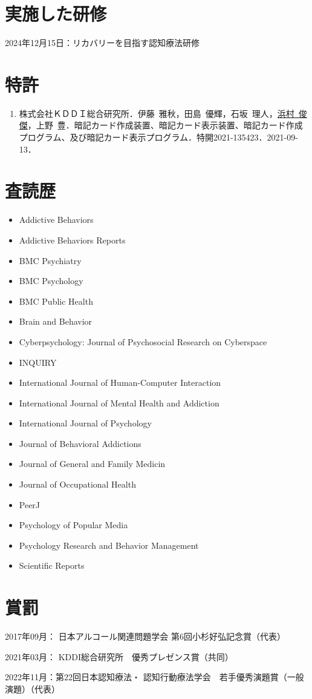 \documentclass[11pt,a4paper]{article}
\begin{document}
\section{実施した研修}
\begin{description}
	\item 2024年12月15日：リカバリーを目指す認知療法研修
\end{description}

\section{特許}
\begin{enumerate}
	\item 株式会社ＫＤＤＩ総合研究所．伊藤\ 雅秋，田島\ 優輝，石坂\ 理人，\underline{浜村\ 俊傑}，上野\ 豊．暗記カード作成装置、暗記カード表示装置、暗記カード作成プログラム、及び暗記カード表示プログラム．特開2021-135423．2021-09-13．
\end{enumerate}

\section{査読歴}
	\begin{itemize}
	\item Addictive Behaviors
	\item Addictive Behaviors Reports
	\item BMC Psychiatry
	\item BMC Psychology
	\item BMC Public Health
	\item Brain and Behavior
	\item Cyberpsychology: Journal of Psychosocial Research on Cyberspace 
	\item INQUIRY
	\item International Journal of Human-Computer Interaction
	\item International Journal of Mental Health and Addiction
	\item International Journal of Psychology
	\item Journal of Behavioral Addictions
	\item Journal of General and Family Medicin
	\item Journal of Occupational Health
	\item PeerJ
	\item Psychology of Popular Media
	\item Psychology Research and Behavior Management 
	\item Scientific Reports
\end{itemize}
\section{賞罰}
\begin{description}
	\item 2017年09月： 日本アルコール関連問題学会 第6回小杉好弘記念賞（代表）
	\item 2021年03月： KDDI総合研究所　優秀プレゼンス賞（共同）
	\item 2022年11月：第22回日本認知療法・	認知行動療法学会　若手優秀演題賞（一般演題）（代表）
\end{description}
\end{document}
